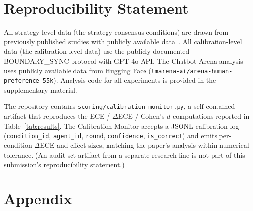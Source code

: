 \documentclass[11pt]{article}
\begin{document}
\section*{Reproducibility Statement}

All strategy-level data (the strategy-consensus conditions) are drawn from previously published studies with publicly available data~\cite{liu2026epc}. All calibration-level data (the calibration-level data) use the publicly documented BOUNDARY\_SYNC protocol with GPT-4o API. The Chatbot Arena analysis uses publicly available data from Hugging Face (\texttt{lmarena-ai/arena-human-preference-55k}). Analysis code for all experiments is provided in the supplementary material.

The repository contains \texttt{scoring/calibration\_monitor.py}, a self-contained artifact
that reproduces the ECE / $\Delta$ECE / Cohen's $d$ computations reported in
Table~\ref{tab:results}. The Calibration Monitor accepts a JSONL
calibration log (\texttt{condition\_id}, \texttt{agent\_id}, \texttt{round},
\texttt{confidence}, \texttt{is\_correct}) and emits per-condition
$\Delta$ECE and effect sizes, matching the paper's analysis within numerical
tolerance. (An audit-set artifact from a separate research line is not part of this submission's reproducibility statement.)




\appendix
\section{Appendix}
\end{document}
